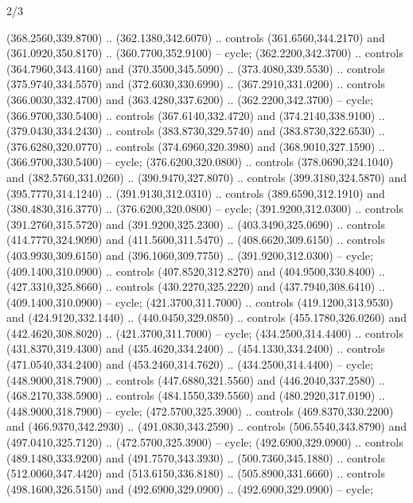 \begin{flagdescription}{2/3}
\begin{scope}[xshift=0.5\flaglength,yshift=0.5\flagwidth,scale=\flagwidth/255]
\begin{scope}[y=-0.43pt, x=0.43pt,xshift=-193pt,yshift=133pt]
\begin{scope}[draw=black,line width=0.003\flagwidth]
\begin{scope}[fill=white]
  (368.2560,339.8700) .. (362.1380,342.6070) .. controls (361.6560,344.2170) and
  (361.0920,350.8170) .. (360.7700,352.9100) -- cycle;
 (362.2200,342.3700) .. controls (364.7960,343.4160) and
  (370.3500,345.5090) .. (373.4080,339.5530) .. controls (375.9740,334.5570) and
  (372.6030,330.6990) .. (367.2910,331.0200) .. controls (366.0030,332.4700) and
  (363.4280,337.6200) .. (362.2200,342.3700) -- cycle;
 (366.9700,330.5400) .. controls (367.6140,332.4720) and
  (374.2140,338.9100) .. (379.0430,334.2430) .. controls (383.8730,329.5740) and
  (383.8730,322.6530) .. (376.6280,320.0770) .. controls (374.6960,320.3980) and
  (368.9010,327.1590) .. (366.9700,330.5400) -- cycle;
 (376.6200,320.0800) .. controls (378.0690,324.1040) and
  (382.5760,331.0260) .. (390.9470,327.8070) .. controls (399.3180,324.5870) and
  (395.7770,314.1240) .. (391.9130,312.0310) .. controls (389.6590,312.1910) and
  (380.4830,316.3770) .. (376.6200,320.0800) -- cycle;
 (391.9200,312.0300) .. controls (391.2760,315.5720) and
  (391.9200,325.2300) .. (403.3490,325.0690) .. controls (414.7770,324.9090) and
  (411.5600,311.5470) .. (408.6620,309.6150) .. controls (403.9930,309.6150) and
  (396.1060,309.7750) .. (391.9200,312.0300) -- cycle;
 (409.1400,310.0900) .. controls (407.8520,312.8270) and
  (404.9500,330.8400) .. (427.3310,325.8660) .. controls (430.2270,325.2220) and
  (437.7940,308.6410) .. (409.1400,310.0900) -- cycle;
 (421.3700,311.7000) .. controls (419.1200,313.9530) and
  (424.9120,332.1440) .. (440.0450,329.0850) .. controls (455.1780,326.0260) and
  (442.4620,308.8020) .. (421.3700,311.7000) -- cycle;
 (434.2500,314.4400) .. controls (431.8370,319.4300) and
  (435.4620,334.2400) .. (454.1330,334.2400) .. controls (471.0540,334.2400) and
  (453.2460,314.7620) .. (434.2500,314.4400) -- cycle;
 (448.9000,318.7900) .. controls (447.6880,321.5560) and
  (446.2040,337.2580) .. (468.2170,338.5900) .. controls (484.1550,339.5560) and
  (480.2920,317.0190) .. (448.9000,318.7900) -- cycle;
 (472.5700,325.3900) .. controls (469.8370,330.2200) and
  (466.9370,342.2930) .. (491.0830,343.2590) .. controls (506.5540,343.8790) and
  (497.0410,325.7120) .. (472.5700,325.3900) -- cycle;
 (492.6900,329.0900) .. controls (489.1480,333.9200) and
  (491.7570,343.3930) .. (500.7360,345.1880) .. controls (512.0060,347.4420) and
  (513.6150,336.8180) .. (505.8900,331.6660) .. controls (498.1600,326.5150) and
  (492.6900,329.0900) .. (492.6900,329.0900) -- cycle;

\end{scope}
\end{scope}
\end{scope}
\end{scope}
\end{flagdescription}
